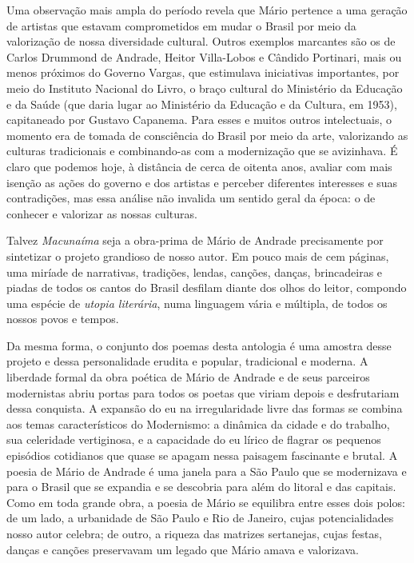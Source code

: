 \documentclass[11pt]{extarticle}
\begin{document}
Uma observação mais ampla do período revela que Mário pertence a uma
geração de artistas que estavam comprometidos em mudar o Brasil por meio
da valorização de nossa diversidade cultural. Outros exemplos marcantes
são os de Carlos Drummond de Andrade, Heitor Villa-Lobos e Cândido
Portinari, mais ou menos próximos do Governo Vargas, que estimulava
iniciativas importantes, por meio do Instituto Nacional do Livro, o
braço cultural do Ministério da Educação e da Saúde (que daria lugar ao
Ministério da Educação e da Cultura, em 1953), capitaneado por Gustavo
Capanema. Para esses e muitos outros intelectuais, o momento era de
tomada de consciência do Brasil por meio da arte, valorizando as
culturas tradicionais e combinando-as com a modernização que se
avizinhava. É claro que podemos hoje, à distância de cerca de oitenta
anos, avaliar com mais isenção as ações do governo e dos artistas e
perceber diferentes interesses e suas contradições, mas essa análise não
invalida um sentido geral da época: o de conhecer e valorizar as nossas
culturas.

Talvez \emph{Macunaíma} seja a obra-prima de Mário de Andrade
precisamente por sintetizar o projeto grandioso de nosso autor. Em pouco
mais de cem páginas, uma miríade de narrativas, tradições, lendas,
canções, danças, brincadeiras e piadas de todos os cantos do Brasil
desfilam diante dos olhos do leitor, compondo uma espécie de
\emph{utopia literária}, numa linguagem vária e múltipla, de todos os
nossos povos e tempos.

Da mesma forma, o conjunto dos poemas desta antologia é uma amostra
desse projeto e dessa personalidade erudita e popular, tradicional e
moderna. A liberdade formal da obra poética de Mário de Andrade e de
seus parceiros modernistas abriu portas para todos os poetas que viriam
depois e desfrutariam dessa conquista. A expansão do eu na
irregularidade livre das formas se combina aos temas característicos do
Modernismo: a dinâmica da cidade e do trabalho, sua celeridade
vertiginosa, e a capacidade do eu lírico de flagrar os pequenos
episódios cotidianos que quase se apagam nessa paisagem fascinante e
brutal. A poesia de Mário de Andrade é uma janela para a São Paulo que
se modernizava e para o Brasil que se expandia e se descobria para além
do litoral e das capitais. Como em toda grande obra, a poesia de Mário
se equilibra entre esses dois polos: de um lado, a urbanidade de São
Paulo e Rio de Janeiro, cujas potencialidades nosso autor celebra; de
outro, a riqueza das matrizes sertanejas, cujas festas, danças e canções
preservavam um legado que Mário amava e valorizava.
\end{document}
